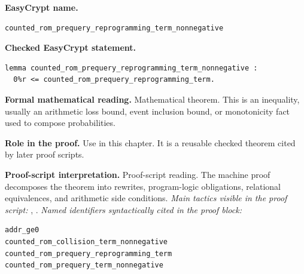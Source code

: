 \begin{formaltheorem}
\noindent\textbf{EasyCrypt name.}
\begin{lstlisting}[language=EasyCrypt,basicstyle=\ttfamily\scriptsize]
counted_rom_prequery_reprogramming_term_nonnegative
\end{lstlisting}
\noindent\textbf{Checked EasyCrypt statement.}
\begin{lstlisting}[language=EasyCrypt,basicstyle=\ttfamily\scriptsize]
lemma counted_rom_prequery_reprogramming_term_nonnegative :
  0%r <= counted_rom_prequery_reprogramming_term.
\end{lstlisting}
\noindent\textbf{Formal mathematical reading.}
Mathematical theorem. This is an inequality, usually an arithmetic loss bound, event inclusion bound, or monotonicity fact used to compose probabilities.

\noindent\textbf{Role in the proof.}
Use in this chapter. It is a reusable checked theorem cited by later proof scripts.

\noindent\textbf{Proof-script interpretation.}
Proof-script reading. The machine proof decomposes the theorem into rewrites, program-logic obligations, relational equivalences, and arithmetic side conditions.
\emph{Main tactics visible in the proof script:} , .
\emph{Named identifiers syntactically cited in the proof block:}
\begin{lstlisting}[language=EasyCrypt,basicstyle=\ttfamily\scriptsize]
addr_ge0
counted_rom_collision_term_nonnegative
counted_rom_prequery_reprogramming_term
counted_rom_prequery_term_nonnegative
\end{lstlisting}

\end{formaltheorem}


